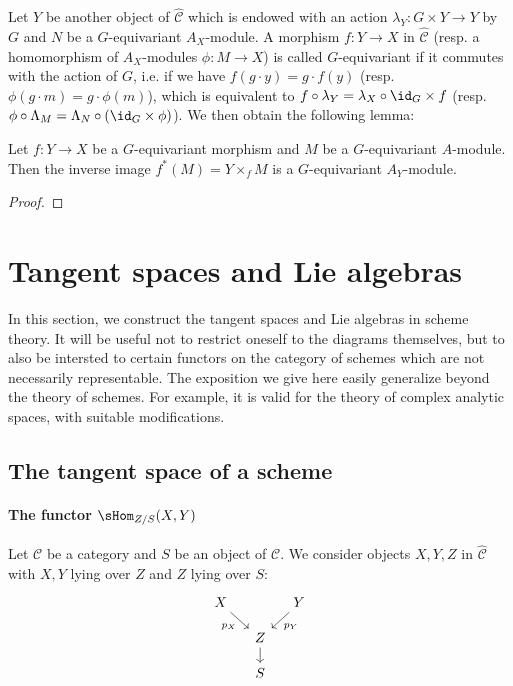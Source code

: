 Let $Y$ be another object of $\widehat{\mathcal{C}}$ which is endowed with an action $\lambda_Y:G\times Y\to Y$ by $G$ and $N$ be a $G$-equivariant $A_X$-module. A morphism $f:Y\to X$ in $\widehat{\mathcal{C}}$ (resp. a homomorphism of $A_X$-modules $\phi:M\to X$) is called $G$-equivariant if it commutes with the action of $G$, i.e. if we have $f(g\cdot y)=g\cdot f(y)$ (resp. $\phi(g\cdot m)=g\cdot\phi(m)$), which is equivalent to $f\circ\lambda_Y=\lambda_X\circ\id_G\times f$ (resp. $\phi\circ\Lambda_M=\Lambda_N\circ(\id_G\times\phi)$). We then obtain the following lemma:

\begin{lemma}\label{category of presheaf G-equivariant pullback}
Let $f:Y\to X$ be a $G$-equivariant morphism and $M$ be a $G$-equivariant $A$-module. Then the inverse image $f^*(M)=Y\times_fM$ is a $G$-equivariant $A_Y$-module.
\end{lemma}
\begin{proof}

\end{proof}

\section{Tangent spaces and Lie algebras}
In this section, we construct the tangent spaces and Lie algebras in scheme theory. It will be useful not to restrict oneself to the diagrams themselves, but to also be intersted to certain functors on the category of schemes which are not necessarily representable. The exposition we give here easily generalize beyond the theory of schemes. For example, it is valid for the theory of complex analytic spaces, with suitable modifications.
\subsection{The tangent space of a scheme}

\paragraph{The functor \texorpdfstring{$\sHom_{Z/S}(X,Y)$}{Hom}}
Let $\mathcal{C}$ be a category and $S$ be an object of $\mathcal{C}$. We consider objects $X,Y,Z$ in $\widehat{\mathcal{C}}$ with $X,Y$ lying over $Z$ and $Z$ lying over $S$:
\[\begin{tikzcd}[row sep=4mm, column sep=4mm]
X\ar[rd,swap,"p_X"]&&Y\ar[ld,"p_Y"]\\
&Z\ar[d]&\\
&S
\end{tikzcd}\]

